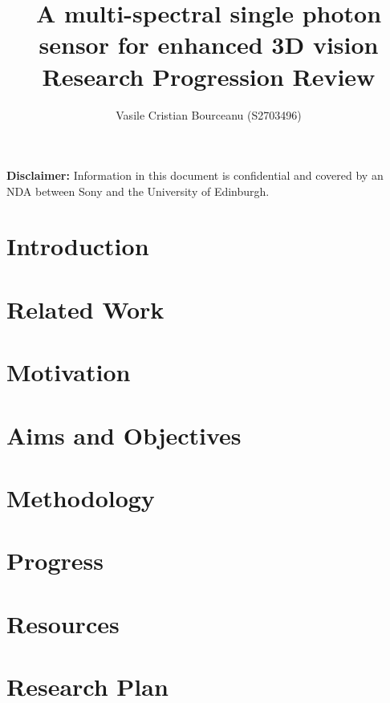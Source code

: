 \documentclass{article}
\begin{document}
\title{%
  A multi-spectral single photon sensor for enhanced 3D vision \\
  \large Research Progression Review}
\author{Vasile Cristian Bourceanu (S2703496)}

\maketitle



\textbf{Disclaimer:} Information in this document is confidential and covered by an NDA between Sony and the University of Edinburgh.

\section{Introduction}
\label{chap:intro}


\section{Related Work}
\label{chap:related}


\section{Motivation}
\label{chap:motivation}


\section{Aims and Objectives}
\label{chap:aims_objectives}


\section{Methodology}
\label{chap:methodology}


\section{Progress}
\label{chap:progress}


\section{Resources}
\label{chap:resources}


\section{Research Plan}
\label{chap:research_plan}


\printbibliography
\end{document}
